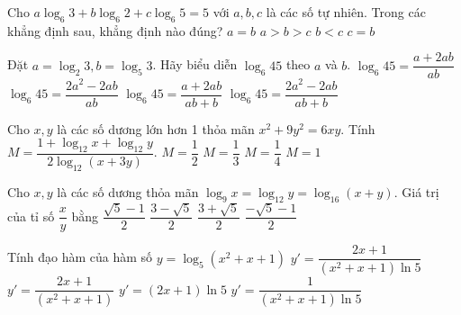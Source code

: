 \begin{ex}%
Cho $a\log_6 3+b\log_6 2+c\log_6 5=5$ với $a,b,c$ là các số tự nhiên. Trong các khẳng định sau, khẳng định nào đúng?
\choice
{\True $a=b$}
{$a>b>c$}
{$b<c$}
{$c=b$}
\end{ex}

\begin{ex}%
Đặt $a=\log_2 3, b=\log_5 3$. Hãy biểu diễn $\log_6 45$ theo $a$ và $b$.
\choice
{$\log_6 45 =\dfrac{a+2ab}{ab}$}
{$\log_6 45 =\dfrac{2a^2-2ab}{ab}$}
{\True $\log_6 45 =\dfrac{a+2ab}{ab+b}$}
{$\log_6 45 =\dfrac{2a^2-2ab}{ab+b}$}
\end{ex}

\begin{ex}%
Cho $x,y$ là các số dương lớn hơn 1 thỏa mãn $x^2+9y^2=6xy$. Tính $M=\dfrac{1+\log_{12} x+ \log_{12} y}{2 \log_{12} (x+3y)}$.
\choice
{$M=\dfrac{1}{2}$}
{$M=\dfrac{1}{3}$}
{$M=\dfrac{1}{4}$}
{\True $M=1$}
\end{ex}

\begin{ex}%
Cho $x,y$ là các số dương thỏa mãn $\log_9 x=\log_{12} y=\log_{16} (x+y)$. Giá trị của tỉ số $\dfrac{x}{y}$ bằng
\choice
{\True $\dfrac{\sqrt{5}-1}{2}$}
{$\dfrac{3-\sqrt{5}}{2}$}
{$\dfrac{3+\sqrt{5}}{2}$}
{$\dfrac{-\sqrt{5}-1}{2}$}
\end{ex}

\begin{ex}%
Tính đạo hàm của hàm số $y=\log_5 (x^2+x+1)$
\choice
{\True $y'=\dfrac{2x+1}{(x^2+x+1)\ln 5}$}
{$y'=\dfrac{2x+1}{(x^2+x+1)}$}
{$y'=(2x+1)\ln 5$}
{$y'=\dfrac{1}{(x^2+x+1)\ln 5}$}
\end{ex}

